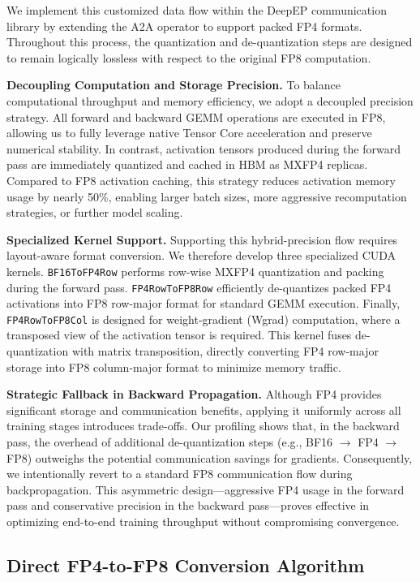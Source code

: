 We implement this customized data flow within the DeepEP communication library by extending the A2A operator to support packed FP4 formats. Throughout this process, the quantization and de-quantization steps are designed to remain logically lossless with respect to the original FP8 computation.

\textbf{Decoupling Computation and Storage Precision.}
To balance computational throughput and memory efficiency, we adopt a decoupled precision strategy. All forward and backward GEMM operations are executed in FP8, allowing us to fully leverage native Tensor Core acceleration and preserve numerical stability. In contrast, activation tensors produced during the forward pass are immediately quantized and cached in HBM as MXFP4 replicas. Compared to FP8 activation caching, this strategy reduces activation memory usage by nearly 50\%, enabling larger batch sizes, more aggressive recomputation strategies, or further model scaling.

\textbf{Specialized Kernel Support.}
Supporting this hybrid-precision flow requires layout-aware format conversion. We therefore develop three specialized CUDA kernels. \texttt{BF16ToFP4Row} performs row-wise MXFP4 quantization and packing during the forward pass. \texttt{FP4RowToFP8Row} efficiently de-quantizes packed FP4 activations into FP8 row-major format for standard GEMM execution. Finally, \texttt{FP4RowToFP8Col} is designed for weight-gradient (Wgrad) computation, where a transposed view of the activation tensor is required. This kernel fuses de-quantization with matrix transposition, directly converting FP4 row-major storage into FP8 column-major format to minimize memory traffic.

\textbf{Strategic Fallback in Backward Propagation.}
Although FP4 provides significant storage and communication benefits, applying it uniformly across all training stages introduces trade-offs. Our profiling shows that, in the backward pass, the overhead of additional de-quantization steps (e.g., BF16 $\rightarrow$ FP4 $\rightarrow$ FP8) outweighs the potential communication savings for gradients. Consequently, we intentionally revert to a standard FP8 communication flow during backpropagation. This asymmetric design—aggressive FP4 usage in the forward pass and conservative precision in the backward pass—proves effective in optimizing end-to-end training throughput without compromising convergence.


\subsection{Direct FP4-to-FP8 Conversion Algorithm}

